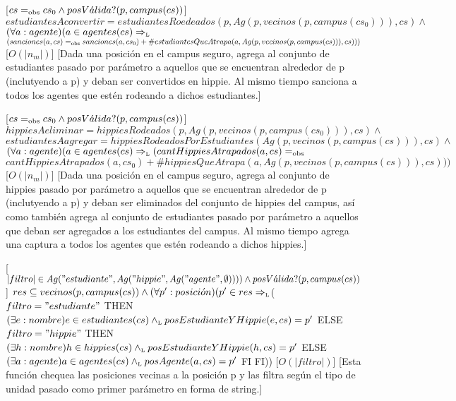 \begin{Interfaz}
   [$cs =_{\mathrm{obs}} cs_{0} \land posV\acute{a}lida?(p,campus(cs))$]
   {$estudiantesAconvertir = estudiantesRoedeados(p,Ag(p,vecinos(p,campus(cs_{0}))),cs) \land$ \\ $(\forall a: agente) (a \in agentes(cs) \Rightarrow_{\mathrm{\scriptscriptstyle{L}}}$ \\ $(sanciones(a,cs) =_{\mathrm{obs}} sanciones(a,cs_{0}) + \#estudiantesQueAtrapa(a,Ag(p,vecinos(p,campus(cs))),cs)))$}
   [$O(|n_{m}|)$]
   [Dada una posici\'on en el campus seguro, agrega al conjunto de estudiantes pasado por par\'ametro a aquellos que se encuentran alrededor de p (inclutyendo a p) y deban ser convertidos en hippie. Al mismo tiempo sanciona a todos los agentes que est\'en rodeando a dichos estudiantes.]
      
   [$cs =_{\mathrm{obs}} cs_{0} \land posV\acute{a}lida?(p,campus(cs))$]
   {$hippiesAeliminar = hippiesRodeados(p,Ag(p,vecinos(p,campus(cs_{0}))),cs) \land$ \\ 
$estudiantesAagregar = hippiesRodeadosPorEstudiantes(Ag(p,vecinos(p,campus(cs))),cs) \land$ \\
$(\forall a: agente) (a \in agentes(cs) \Rightarrow_{\mathrm{\scriptscriptstyle{L}}} (cantHippiesAtrapados(a,cs) =_{\mathrm{obs}}$ \\ $cantHippiesAtrapados(a,cs_{0}) + \#hippiesQueAtrapa(a,Ag(p,vecinos(p,campus(cs))),cs)))$}
   [$O(|n_{m}|)$]
   [Dada una posici\'on en el campus seguro, agrega al conjunto de hippies pasado por par\'ametro a aquellos que se encuentran alrededor de p (inclutyendo a p) y deban ser eliminados del conjunto de hippies del campus, as\'i como tambi\'en agrega al conjunto de estudiantes pasado por par\'ametro a aquellos que deban ser agregados a los estudiantes del campus. Al mismo tiempo agrega una captura a todos los agentes que est\'en rodeando a dichos hippies.]

[$|filtro| \in Ag("estudiante",Ag("hippie",Ag("agente",\emptyset)))) \land posV\acute{a}lida?(p,campus(cs))$]
{$res \subseteq vecinos(p,campus(cs)) \land (\forall p': posici\acute{o}n) (p' \in res \Rightarrow_{\mathrm{\scriptscriptstyle{L}}} $(\IF $filtro = "estudiante"$ THEN $(\exists e: nombre) e \in estudiantes(cs) \land_{\mathrm{\scriptscriptstyle{L}}} posEstudianteYHippie(e,cs) = p'$ ELSE
{\IF $filtro = "hippie"$ THEN $(\exists h: nombre) h \in hippies(cs) \land_{\mathrm{\scriptscriptstyle{L}}} posEstudianteYHippie(h,cs) = p'$ ELSE {$(\exists a: agente) a \in agentes(cs) \land_{\mathrm{\scriptscriptstyle{L}}} posAgente(a,cs) = p'$} FI} FI))}
[$O(|filtro|)$]
[Esta funci\'on chequea las posiciones vecinas a la posici\'on p y las filtra seg\'un el tipo de unidad pasado como primer par\'ametro en forma de string.]


\end{Interfaz}
